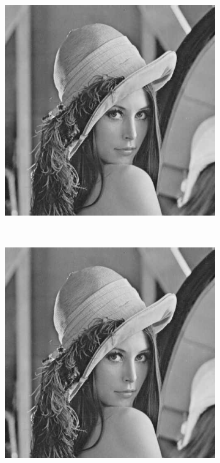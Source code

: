 \documentclass{article}
\begin{document}
\begin{figure}[htbp]
\begin{subfigure}{.19\textwidth}
    \end{subfigure}
    \begin{subfigure}{.19\textwidth}
        \includegraphics[width=\linewidth]{img/jpeg/40.jpg}
    \end{subfigure}\\
    \begin{subfigure}{.19\textwidth}
        \includegraphics[width=\linewidth]{img/jpeg/50.jpg}

\end{subfigure}
\end{figure}
\end{document}
